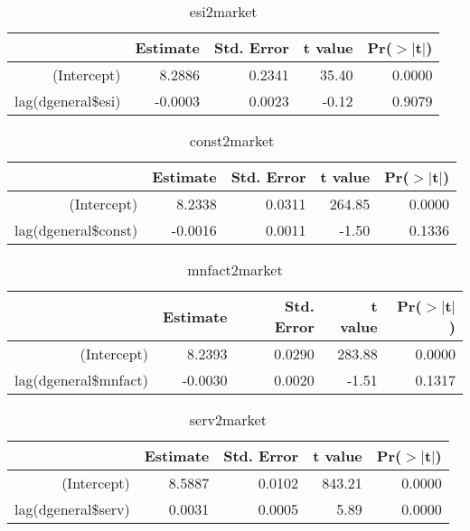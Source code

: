 \documentclass[12pt,a4paper]{report}
\author{Ahmed Salhin}
\begin{document}
	\begin{table}[ht]
		\centering
		\begin{tabular}{rrrrr}
			\hline
			& Estimate & Std. Error & t value & Pr($>$$|$t$|$) \\ 
			\hline
			(Intercept) & 8.2886 & 0.2341 & 35.40 & 0.0000 \\ 
			lag(dgeneral\$esi) & -0.0003 & 0.0023 & -0.12 & 0.9079 \\ 
			\hline
		\end{tabular}
		\caption{esi2market} 
	\end{table}

	\begin{table}[ht]
		\centering
		\begin{tabular}{rrrrr}
			\hline
			& Estimate & Std. Error & t value & Pr($>$$|$t$|$) \\ 
			\hline
			(Intercept) & 8.2338 & 0.0311 & 264.85 & 0.0000 \\ 
			lag(dgeneral\$const) & -0.0016 & 0.0011 & -1.50 & 0.1336 \\ 
			\hline
		\end{tabular}
		\caption{const2market} 
	\end{table}
	
	\begin{table}[ht]
		\centering
		\begin{tabular}{rrrrr}
			\hline
			& Estimate & Std. Error & t value & Pr($>$$|$t$|$) \\ 
			\hline
			(Intercept) & 8.2393 & 0.0290 & 283.88 & 0.0000 \\ 
			lag(dgeneral\$mnfact) & -0.0030 & 0.0020 & -1.51 & 0.1317 \\ 
			\hline
		\end{tabular}
		\caption{mnfact2market} 
	\end{table}
	
	\begin{table}[ht]
		\centering
		\begin{tabular}{rrrrr}
			\hline
			& Estimate & Std. Error & t value & Pr($>$$|$t$|$) \\ 
			\hline
			(Intercept) & 8.5887 & 0.0102 & 843.21 & 0.0000 \\ 
			lag(dgeneral\$serv) & 0.0031 & 0.0005 & 5.89 & 0.0000 \\ 
			\hline
		\end{tabular}
		\caption{serv2market} 
	\end{table}
	
\end{document}
